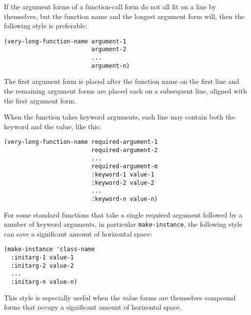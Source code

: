 If the argument forms of a function-call form do not all fit on a line
by themselves, but the function name and the longest argument form
will, then the following style is preferable:

\begin{verbatim}
(very-long-function-name argument-1
                         argument-2
                         ...
                         argument-n)
\end{verbatim}

The first argument form is placed after the function name on the first
line and the remaining argument forms are placed each on a subsequent
line, aligned with the first argument form.

When the function takes keyword arguments, each line may contain both
the keyword and the value, like this:

\begin{verbatim}
(very-long-function-name required-argument-1
                         required-argument-2
                         ...
                         required-argument-m
                         :keyword-1 value-1
                         :keyword-2 value-2
                         ...
                         :keyword-n value-n)
\end{verbatim}

For some standard functions that take a single required argument
followed by a number of keyword arguments, in particular
\texttt{make-instance}, the following style can save a significant
amount of horizontal space:

\begin{verbatim}
(make-instance 'class-name
  :initarg-1 value-1
  :initarg-2 value-2
  ...
  :initarg-n value-n)
\end{verbatim}

This style is especially useful when the value forms are themselves
compound forms that occupy a significant amount of horizontal space.
